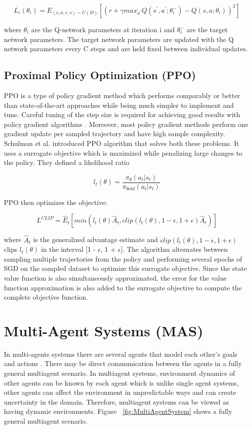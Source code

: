 \documentclass[12pt]{report}
\begin{document}
\[ L_i (\theta_i) = E_{(s,a,r,s) \sim U(D) } [(r +  \gamma max_{a^{'}} Q(s^{'}, a^{'} ; \theta_i^{-}) - Q(s,a; \theta_{i}))^2] \]

\hfill \break
where $\theta_i$ are the Q-network parameters at iteration i and $\theta_i^{-}$  are the target network parameters. The target network parameters are updated with the Q network parameters every C steps and are held fixed between individual updates. \\

\subsection{Proximal Policy Optimization (PPO)} PPO is a type of policy gradient method which performs  comparably or better than state-of-the-art approaches while being much simpler to implement and tune. Careful tuning of the step size is required for achieving good results with policy gradient algorithms \cite{PPO}. Moreover, most policy gradient methods perform one gradient update per sampled trajectory and have high sample complexity. Schulman et al. \cite{Schulman} introduced PPO algorithm that solves both these problems. It uses a surrogate objective which is maximized while penalizing large changes to the policy. 
They defined a likelihood ratio 

\[ l_t(\theta) = \frac{\pi_\theta(a_t | s_t)}{\pi_{\theta old}(a_t | s_t)}\]

\hfill \break
PPO then optimizes the objective: 

\[ L^{CLIP} = \hat{E}_t [min(l_t(\theta) \hat{A}_t, clip(l_t (\theta) , 1- \epsilon , 1+\epsilon)\hat{A}_t)] \]

\hfill \break
where $\hat{A}_t$ is the generalized advantage estimate and $clip(l_t (\theta) , 1- \epsilon , 1+\epsilon)$ clips $l_t(\theta)$ in the interval [1 - $\epsilon$, 1 + $\epsilon$]. The algorithm alternates between sampling multiple trajectories from the policy and performing several epochs of SGD on the
sampled dataset to optimize this surrogate objective. Since the state value function is also simultaneously approximated, the error for the value function approximation is also added to the surrogate
objective to compute the complete objective function. 

\section{Multi-Agent Systems (MAS)}

In multi-agents systems there are several agents that model each other's goals and actions \cite{Stone}. There may be direct communication between the agents in a fully general multiagent scenario. In multiagent systems, environment dynamics of other agents can be known by each agent which is unlike single agent systems, other agents can affect the environment in unpredictable ways and can create uncertainty in the domain. Therefore, multiagent systems can be viewed as having dynamic environments. Figure ~\ref{fig:MultiAgentSystem} shows a fully general multiagent scenario. 
\end{document}
